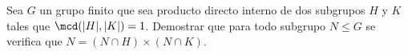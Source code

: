 \begin{ejercicio}
    Sea $G$ un grupo finito que sea producto directo interno de dos subgrupos $H$ y $K$ tales que $\mcd(|H|,|K|)=1$. Demostrar que para todo subgrupo $N\leq G$ se verifica que $N=(N\cap H)\times (N\cap K)$.\\

    \begin{comment}

    Como $G$ es producto directo interno de $H$ y $K$, consideramos el siguiente isomorfismo:
    \Func{f}{G}{H\times K}{g=hk}{(h,k)}

    Dado $N\leq G$, consideramos $f(N)<H\times K$. Como $\mcd(|H|,|K|)=1$, se tiene que $\exists_1 H_1\leq H$ y $K_1\leq K$ tales que $f(N)=H_1\times K_1$. De hecho, se tiene que:
    \begin{align*}
        H_1 = \pi_1(f(N)) &= \{h\in H\mid \exists k\in K, n\in N\text{ tal que }f(n)=(h,k)\}\\
        &= \{h\in H\mid \exists k\in K\ \text{ tal que }hk\in N\}\\
        K_1 = \pi_2(f(N)) &= \{k\in K\mid \exists h\in H, n\in N\text{ tal que }f(n)=(h,k)\}\\
        &= \{k\in K\mid \exists h\in H\ \text{ tal que }hk\in N\}
    \end{align*}
    \end{comment}
\end{ejercicio}

